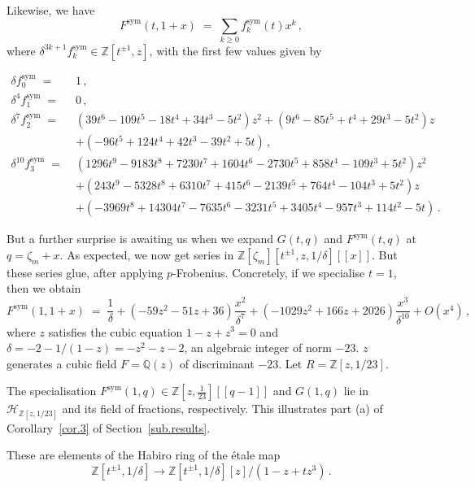 \documentclass[12pt,reqno]{amsart}
\theoremstyle{definition}
\def\BZ{\mathbb Z}
\def\BQ{\mathbb Q}
\def\calH{\mathcal H}
\def\be{\begin{equation}}
\def\ee{\end{equation}}
\def\z{\zeta}
\def\={\;=\;}
\def\sym{\mathrm{sym}}
\begin{document}
\noindent
Likewise, we have
\be
\label{Fsymexp}
F^\sym(t,1+x) \= \sum_{k \geq 0} f^\sym_k(t) x^k\,,
\ee
where $\delta^{3k+1} f^\sym_k \in \BZ[t^{\pm 1}, z]$, with the first few
values given by 

\be
\label{fsymvals3}
\begin{aligned}
\delta f^\sym_0 \= & 1\,,
\\
\delta^4 f^\sym_1 \= & 0\,,
\\
\delta^7 f^\sym_2 \= &
(39 t^6 - 109 t^5 - 18 t^4 + 34 t^3 - 5 t^2) z^2
+ (9 t^6 - 85 t^5 + t^4 + 29 t^3 - 5 t^2) z
\\ & + (-96 t^5 + 124 t^4 + 42 t^3 - 39 t^2 + 5 t)\,,
\\
\delta^{10} f^\sym_3 \= &
(1296 t^9 - 9183 t^8 + 7230 t^7 + 1604 t^6 - 2730 t^5 + 858 t^4 - 109 t^3 + 5 t^2) z^2
\\ &
+ (243 t^9 - 5328 t^8 + 6310 t^7 + 415 t^6 - 2139 t^5 + 764 t^4 - 104 t^3 + 5 t^2) z
\\ &
+ (-3969 t^8 + 14304 t^7 - 7635 t^6 - 3231 t^5 + 3405 t^4 - 957 t^3 + 114 t^2 - 5 t)
\,.
\end{aligned}
\ee

But a further surprise is awaiting us when we expand $G(t,q)$ and $F^\sym(t,q)$
at $q=\z_m+x$. As expected, we now get series in
$\BZ[\z_m][t^{\pm 1},z,1/\delta][\![x]\!]$. But these series glue, after applying
$p$-Frobenius. Concretely, if we specialise $t=1$, then we obtain
\be\label{eq:ex.fsym.admis1}
F^\sym(1,1+x) \= \frac{1}{\delta} + (- 59 z^2 - 51 z + 36) \frac{x^2}{\delta^7} +
(- 1029 z^2 + 166 z + 2026) \frac{x^3}{\delta^{10}} + O(x^4) \,,
\ee
where $z$ satisfies the cubic equation $1-z+z^3=0$ and
$\delta=-2-1/(1-z)=-z^2-z-2$, an algebraic integer of norm $-23$. $z$ generates
a cubic field $F=\BQ(z)$ of discriminant $-23$. Let $R=\BZ[z,1/23]$.

The specialisation $F^\sym(1,q)\in \BZ[z,\frac{1}{23}][\![q-1]\!]$ and
$G(1,q)$ lie in $\calH_{\BZ[z,1/23]}$ and its field of fractions, respectively.
This illustrates part (a) of Corollary~\ref{cor.3} of Section~\ref{sub.results}.

These are elements of the Habiro ring of the \'etale map
\be
\label{Hetale}
\BZ[t^{\pm 1},1/\delta] \to \BZ[t^{\pm 1},1/\delta][z]/(1-z + t z^3) \,.
\ee
\end{document}
